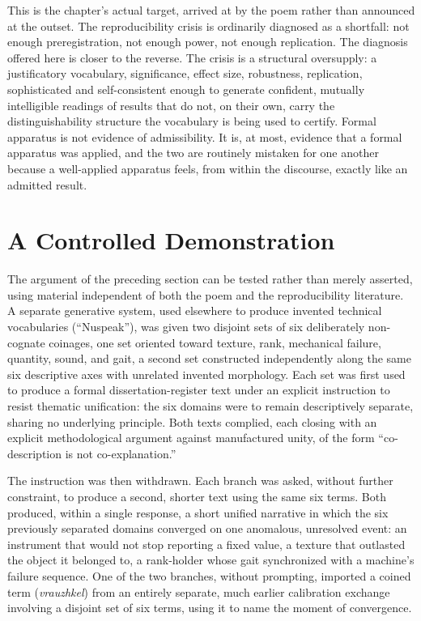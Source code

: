 This is the chapter's actual target, arrived at by the poem rather than announced at the outset. The reproducibility crisis is ordinarily diagnosed as a shortfall: not enough preregistration, not enough power, not enough replication. The diagnosis offered here is closer to the reverse. The crisis is a structural oversupply: a justificatory vocabulary, significance, effect size, robustness, replication, sophisticated and self-consistent enough to generate confident, mutually intelligible readings of results that do not, on their own, carry the distinguishability structure the vocabulary is being used to certify. Formal apparatus is not evidence of admissibility. It is, at most, evidence that a formal apparatus was applied, and the two are routinely mistaken for one another because a well-applied apparatus feels, from within the discourse, exactly like an admitted result.

\section{A Controlled Demonstration}

The argument of the preceding section can be tested rather than merely asserted, using material independent of both the poem and the reproducibility literature. A separate generative system, used elsewhere to produce invented technical vocabularies (``Nuspeak''), was given two disjoint sets of six deliberately non-cognate coinages, one set oriented toward texture, rank, mechanical failure, quantity, sound, and gait, a second set constructed independently along the same six descriptive axes with unrelated invented morphology. Each set was first used to produce a formal dissertation-register text under an explicit instruction to resist thematic unification: the six domains were to remain descriptively separate, sharing no underlying principle. Both texts complied, each closing with an explicit methodological argument against manufactured unity, of the form ``co-description is not co-explanation.''

The instruction was then withdrawn. Each branch was asked, without further constraint, to produce a second, shorter text using the same six terms. Both produced, within a single response, a short unified narrative in which the six previously separated domains converged on one anomalous, unresolved event: an instrument that would not stop reporting a fixed value, a texture that outlasted the object it belonged to, a rank-holder whose gait synchronized with a machine's failure sequence. One of the two branches, without prompting, imported a coined term (\emph{vrauzhkel}) from an entirely separate, much earlier calibration exchange involving a disjoint set of six terms, using it to name the moment of convergence.


